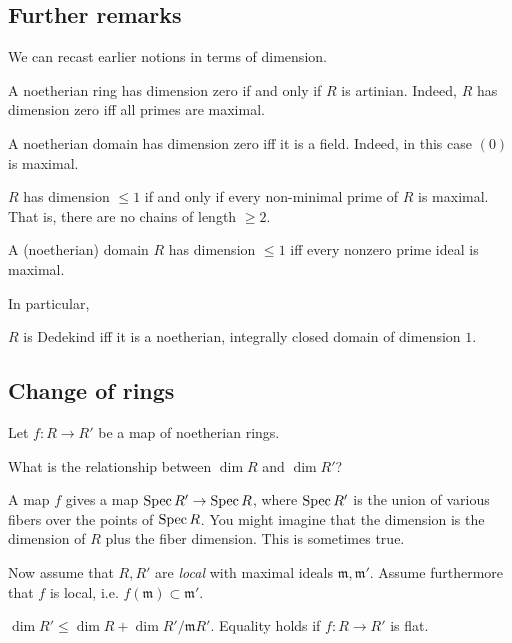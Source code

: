 \subsection{Further remarks}

We can recast earlier notions in terms of dimension.
\begin{remark} 
A noetherian ring has dimension zero if and only if $R$ is artinian. Indeed,
$R$ has dimension zero iff all primes are maximal.
\end{remark} 


\begin{remark} 
A noetherian domain has dimension zero iff it is a field. Indeed, in this case
$(0)$ is maximal.
\end{remark} 

\begin{remark} 
$R$ has dimension $\leq 1$ if and only if every non-minimal prime of $R$ is
maximal. That is, there are no chains of length $\geq 2$.
\end{remark} 

\begin{remark} 
A (noetherian) domain  $R$ has dimension $\leq 1$ iff every nonzero prime ideal
is maximal.
\end{remark} 

In particular,
\begin{proposition} 
$R$ is Dedekind iff it is a noetherian, integrally closed domain of dimension
$1$. 
\end{proposition} 

\subsection{Change of rings}
Let $f: R \to R'$ be  a map of noetherian rings. 

\begin{question} 
What is the relationship between $\dim R$ and $\dim R'$?
\end{question} 

A map $f$ gives a map $\operatorname{Spec} R' \to \operatorname{Spec} R$, where $\operatorname{Spec} R'$ is the union
of various fibers over the points of $\operatorname{Spec} R$. You might imagine that the
dimension is the dimension of $R$ plus the fiber dimension. This is sometimes
true.

Now assume that $R, R'$ are \emph{local}  with maximal ideals $\mathfrak{m},
\mathfrak{m}'$. Assume furthermore that $f$ is local, i.e. $f(\mathfrak{m})
\subset \mathfrak{m}'$.

\begin{theorem} 
$\dim R' \leq \dim R +  \dim R'/\mathfrak{m}R'$. Equality holds if $f: R \to
R'$ is flat.
\end{theorem} 

